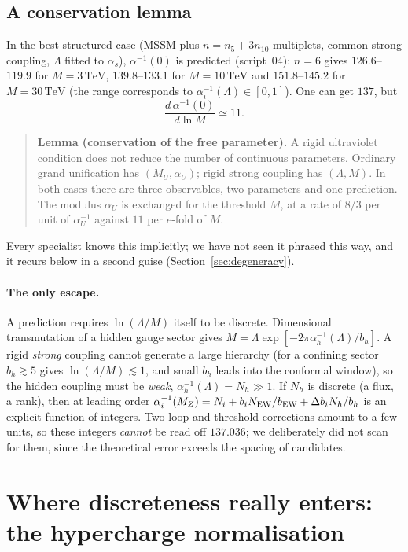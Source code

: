 \documentclass[11pt,a4paper]{article}
\newcommand{\ainv}{\alpha^{-1}}
\newcommand{\TeV}{\,\mathrm{TeV}}
\newcommand{\MU}{M_U}
\begin{document}
\subsection{A conservation lemma}
In the best structured case (MSSM plus $n=n_5+3n_{10}$ multiplets, common strong coupling, $\Lambda$ fitted to $\alpha_s$),
$\ainv(0)$ is predicted (script~04): $n=6$ gives $126.6$--$119.9$ for $M=3\TeV$, $\mathbf{139.8}$--$\mathbf{133.1}$ for
$M=10\TeV$ and $151.8$--$145.2$ for $M=30\TeV$ (the range corresponds to $\ainv_i(\Lambda)\in[0,1]$). One can get $137$, but
\begin{equation}
\frac{d\,\ainv(0)}{d\ln M}\simeq11 .
\end{equation}
\begin{quote}\textbf{Lemma (conservation of the free parameter).} A rigid ultraviolet condition does not reduce the number of
continuous parameters. Ordinary grand unification has $(\MU,\alpha_U)$; rigid strong coupling has $(\Lambda,M)$. In both cases
there are three observables, two parameters and one prediction. The modulus $\alpha_U$ is exchanged for the threshold $M$, at
a rate of $8/3$ per unit of $\ainv_U$ against $11$ per $e$-fold of $M$.\end{quote}
Every specialist knows this implicitly; we have not seen it phrased this way, and it recurs below in a second guise
(Section~\ref{sec:degeneracy}).

\paragraph{The only escape.} A prediction requires $\ln(\Lambda/M)$ itself to be discrete. Dimensional transmutation of a
hidden gauge sector gives $M=\Lambda\exp[-2\pi\ainv_h(\Lambda)/b_h]$. A rigid \emph{strong} coupling cannot generate a large
hierarchy (for a confining sector $b_h\gtrsim5$ gives $\ln(\Lambda/M)\lesssim1$, and small $b_h$ leads into the conformal
window), so the hidden coupling must be \emph{weak}, $\ainv_h(\Lambda)=N_h\gg1$. If $N_h$ is discrete (a flux, a rank), then at
leading order $\ainv_i(M_Z)=N_i+b_iN_{\rm EW}/b_{\rm EW}+\Delta b_iN_h/b_h$ is an explicit function of integers. Two-loop and
threshold corrections amount to a few units, so these integers \emph{cannot} be read off $137.036$; we deliberately did not scan
for them, since the theoretical error exceeds the spacing of candidates.

\section{Where discreteness really enters: the hypercharge normalisation}
\end{document}
